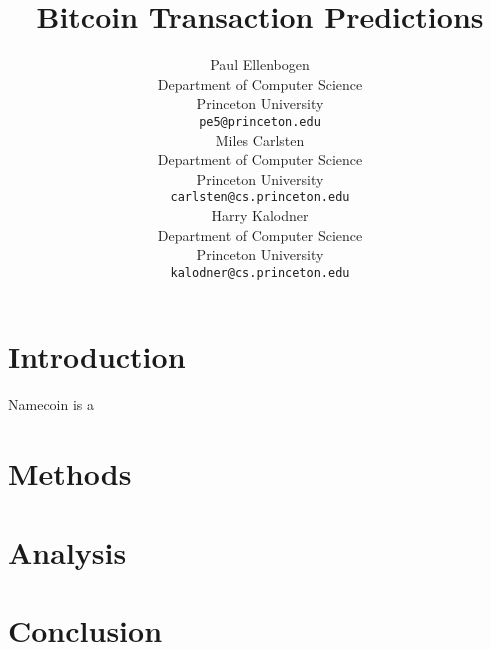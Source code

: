 \documentclass{article} %
\title{Bitcoin Transaction Predictions}
\author{
Paul Ellenbogen \\
Department of Computer Science\\
Princeton University\\
\texttt{pe5@princeton.edu} \\
\And
Miles Carlsten\\
Department of Computer Science \\
Princeton University\\
\texttt{carlsten@cs.princeton.edu} \\
\And
Harry Kalodner\\
Department of Computer Science \\
Princeton University\\
\texttt{kalodner@cs.princeton.edu} \\
}
\begin{document}
\maketitle

\begin{abstract}
\end{abstract}

\section{Introduction}
    Namecoin is a 

\section{Methods}
 
\section{Analysis}


\section{Conclusion}

\newpage
\printbibliography
\end{document}
